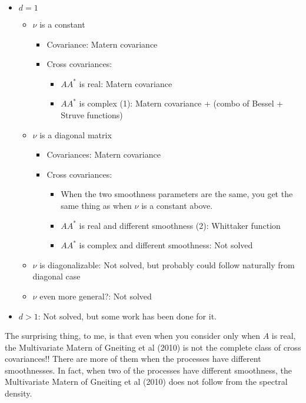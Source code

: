 \documentclass[11pt]{article}
\begin{document}
\begin{itemize}
\item $d=1$
\begin{itemize}
\item $\nu$ is a constant
\begin{itemize}
\item Covariance: Matern covariance
\item Cross covariances:
\begin{itemize}
\item $AA^*$ is real: Matern covariance
\item $AA^*$ is complex (1): Matern covariance + (combo of Bessel + Struve functions)
\end{itemize}
\end{itemize}
\item $\nu$ is a diagonal matrix
\begin{itemize}
\item Covariances: Matern covariance
\item Cross covariances: \begin{itemize}
\item When the two smoothness parameters are the same, you get the same thing as when $\nu$ is a constant above.
\item $AA^*$ is real and different smoothness (2): Whittaker function
\item $AA^*$ is complex and different smoothness: Not solved
\end{itemize}
\end{itemize}
\item $\nu$ is diagonalizable: Not solved, but probably could follow naturally from diagonal case
\item $\nu$ even more general?: Not solved
\end{itemize}
\item $d > 1$: Not solved, but some work has been done for it.
\end{itemize}

The surprising thing, to me, is that even when you consider only when $A$ is real, the Multivariate Matern of Gneiting et al (2010) is not the complete class of cross covariances!! There are more of them when the processes have different smoothnesses. %
In fact, when two of the processes have different smoothness, the Multivariate Matern of Gneiting et al (2010) does not follow from the spectral density.
\end{document}
